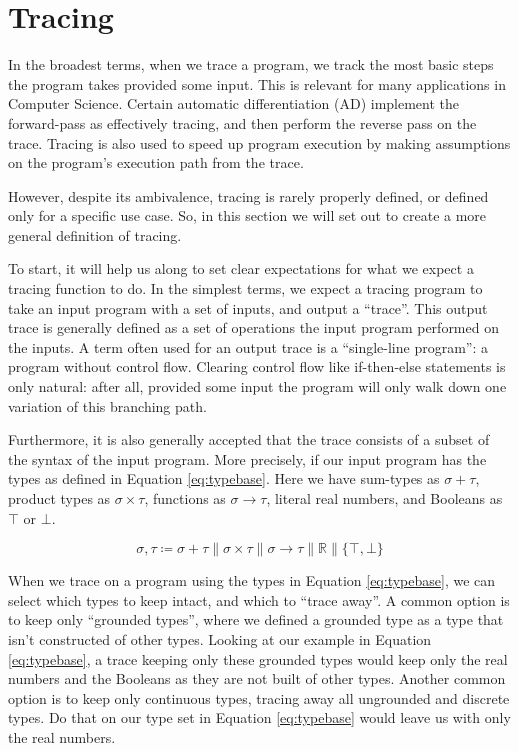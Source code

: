 \section{Tracing}
    In the broadest terms, when we trace a program, we track the most basic steps the program takes provided some input.
    This is relevant for many applications in Computer Science.
    Certain automatic differentiation (AD) implement the forward-pass as effectively tracing, and then perform the reverse pass on the trace\cn.
    Tracing is also used to speed up program execution by making assumptions on the program's execution path from the trace\cn.

    However, despite its ambivalence, tracing is rarely properly defined, or defined only for a specific use case.
    So, in this section we will set out to create a more general definition of tracing.
    
    To start, it will help us along to set clear expectations for what we expect a tracing function to do.
    In the simplest terms, we expect a tracing program to take an input program with a set of inputs, and output a ``trace''.
    This output trace is generally defined as a set of operations the input program performed on the inputs.
    A term often used for an output trace is a ``single-line program''\cn: a program without control flow.
    Clearing control flow like if-then-else statements is only natural: after all, provided some input the program will only walk down one variation of this branching path.

    Furthermore, it is also generally accepted that the trace consists of a subset of the syntax of the input program.
    More precisely, if our input program has the types as defined in Equation \ref{eq:typebase}.
    Here we have sum-types as $\sigma+\tau$, product types as $\sigma\times\tau$, functions as $\sigma\to\tau$, literal real numbers, and Booleans as $\top$ or $\bot$.

    \begin{equation}
        \label{eq:typebase}
        \sigma,\tau\coloneqq\sigma+\tau\|\sigma\times\tau\|\sigma\to\tau\|\mathbb{R}\|\{\top,\bot\}
    \end{equation}

    When we trace on a program using the types in Equation \ref{eq:typebase}, we can select which types to keep intact, and which to ``trace away''.
    A common option is to keep only ``grounded types'', where we defined a grounded type as a type that isn't constructed of other types.
    Looking at our example in Equation \ref{eq:typebase}, a trace keeping only these grounded types would keep only the real numbers and the Booleans as they are not built of other types.
    Another common option is to keep only continuous types, tracing away all ungrounded and discrete types.
    Do that on our type set in Equation \ref{eq:typebase} would leave us with only the real numbers.

